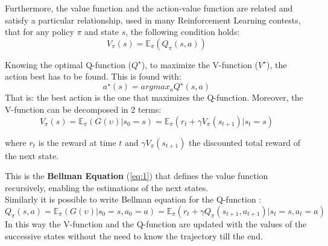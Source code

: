 \documentclass[14pt]{extarticle}
\def\pp{\vspace{10pt}\newline}
\begin{document}
\begin{flushleft}
Furthermore, the value function and the action-value function are related and satisfy a particular relationship, used in many Reinforcement Learning contests, that for any policy $\pi$ and state $s$, the following condition holds:
\[V_{\pi}(s) = \mathbb{E}_{\pi}(Q_{\pi}(s,a))\]

Knowing the optimal Q-function ($Q^\star$), to maximize the V-function ($V^\star$), the action best has to be found. This is found with:
\[ a^\star(s) = argmax_a Q^\star(s,a)\]
That is: the best action is the one that maximizes the Q-function.
\pp
Moreover, the V-function can be decomposed in 2 terms:
\begin{equation} \label{eq:1}
V_{\pi}(s) = \mathbb{E}_{\pi}(G(\upsilon)|s_0=s) =
					\mathbb{E}_{\pi}( r_t + \gamma V_{\pi}(s_{t+1})|s_t=s)
\end{equation}
\begin{center}
where $r_t$ is the reward at time $t$ and $\gamma V_{\pi}(s_{t+1})$ the discounted total reward of the next state.
\end{center}

This is the \textbf{Bellman Equation} (\ref{eq:1}) that defines the value function recursively, enabling the estimations of the next states. \\
Similarly it is possible to write Bellman equation for the Q-function :
\[Q_{\pi}(s,a) = \mathbb{E}_{\pi}(G(\upsilon)|s_0=s, a_0=a) = 
\mathbb{E}_{\pi}(r_t + \gamma Q_{\pi}(s_{t+1},a_{t+1})| s_t=s, a_t=a) \]
In this way the V-function and the  Q-function are updated with the values of the successive states without the need to know the trajectory till the end.


\end{flushleft}
\end{document}
